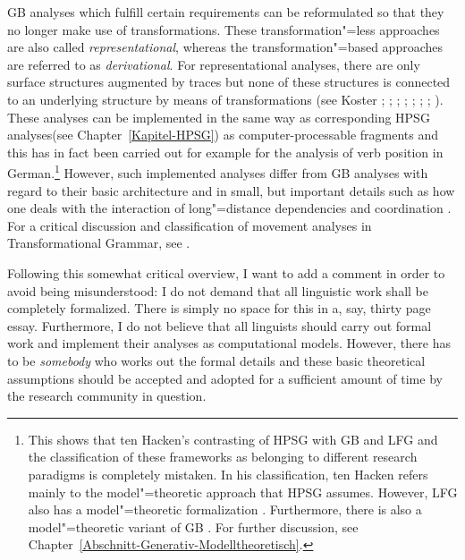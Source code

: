 GB analyses\label{Seite-Representationelle-GB} which fulfill certain requirements can be reformulated so that they no longer make use of transformations.
These transformation"=less approaches are also called \emph{representational}, whereas the transformation"=based approaches are referred to as
\emph{derivational}. For representational analyses, there are only surface structures augmented by traces but none of these structures is connected
to an underlying structure by means of transformations (see \eg %
Koster \citeyear[\page ]{Koster78b-u}; \citeyear[]{Koster87a-u}; 
\citealp{KT91a}; \citealp[Section~1.4]{Haider93a}; 
\citealp[]{Frey93a}; \citealp[--88, 177--178]{Lohnstein93a-u}; \citealp[]{FC94a}; \citealp[]{Veenstra98a}).
These analyses can be implemented in the same way as corresponding HPSG analyses\indexhpsg (see
Chapter~\ref{Kapitel-HPSG}) as computer-processable fragments and this has in fact been carried out
for example for the analysis of verb position in German.\footnote{%
	This shows that ten Hacken's contrasting of HPSG with GB and LFG \citep[Section~4.3]{TenHacken2007a}
        and the classification of these frameworks as belonging to different research paradigms is
        completely mistaken. In his classification, ten Hacken refers mainly to the model"=theoretic
        approach that HPSG assumes. However, LFG also has a model"=theoretic formalization
        \citep{Kaplan95a}. Furthermore, there is also a model"=theoretic variant of GB
	\citep{Rogers98a-u}. For further discussion, see Chapter~\ref{Abschnitt-Generativ-Modelltheoretisch}. 
}
However, such implemented analyses differ from GB analyses with regard to their basic architecture and in small, but important details such as how one deals with
the interaction of long"=distance dependencies and coordination \citep{Gazdar81}. For a critical discussion and classification of movement analyses
in Transformational Grammar, see . 

Following this somewhat critical overview, I want to add a comment in order to avoid being misunderstood:
I do not demand that all linguistic work shall be completely formalized. There is simply
no space for this in a, say, thirty page essay. Furthermore, I do not believe that all linguists
should carry out formal work and implement their analyses as computational models. However, there
has to be \emph{somebody} who works out the formal details and these basic theoretical assumptions
should be accepted and adopted for a sufficient amount of time by the research community in
question.


